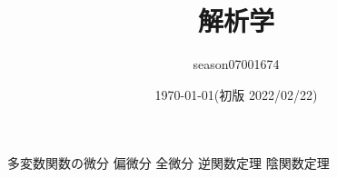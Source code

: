 \documentclass{jsarticle}
\title{解析学}
\author{season07001674}
\date{\today(初版 2022/02/22)}
\renewcommand{\(}{\left(}
\renewcommand{\)}{\right)}
\begin{document}
\maketitle
\tableofcontents





多変数関数の微分
偏微分
全微分
逆関数定理
陰関数定理
\end{document}
